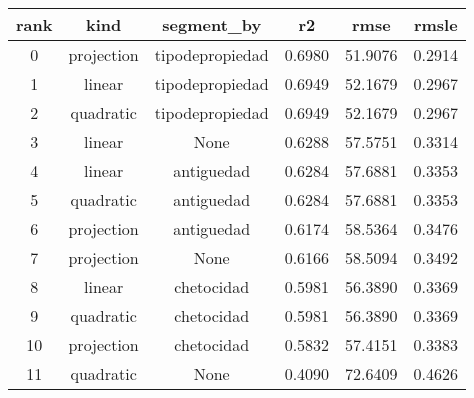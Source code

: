 \begin{center}
\begin{tabular}{ |c|c|c|c|c|c| } 
\hline
\textbf{rank}    & kind    & segment_by  & r2    & rmse    & rmsle \\ \hline
0   & projection  & tipodepropiedad   & 0.6980 & 51.9076  & 0.2914 \\ \hline
1   & linear  & tipodepropiedad   & 0.6949 & 52.1679  & 0.2967 \\ \hline
2   & quadratic    & tipodepropiedad    & 0.6949  & 52.1679   & 0.2967 \\ \hline
3   & linear  & None  & 0.6288    & 57.5751 & 0.3314 \\ \hline
4   & linear  & antiguedad    & 0.6284  & 57.6881   & 0.3353 \\ \hline
5   & quadratic    & antiguedad & 0.6284   & 57.6881    & 0.3353 \\ \hline
6   & projection  & antiguedad    & 0.6174  & 58.5364   & 0.3476 \\ \hline
7   & projection  & None  & 0.6166    & 58.5094 & 0.3492 \\ \hline
8   & linear  & chetocidad    & 0.5981  & 56.3890   & 0.3369 \\ \hline
9   & quadratic    & chetocidad & 0.5981   & 56.3890    & 0.3369 \\ \hline
10  & projection    & chetocidad   & 0.5832 & 57.4151  & 0.3383 \\ \hline
11  & quadratic  & None  & 0.4090    & 72.6409 & 0.4626 \\ \hline
\end{tabular}
\end{center}

